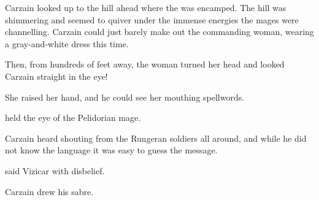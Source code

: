 Carzain looked up to the hill ahead where the \ishrah was encamped. 
The hill was shimmering and seemed to quiver under the immense energies the mages were channelling. 
Carzain could just barely make out the commanding woman, wearing a gray-and-white dress this time.

Then, from hundreds of feet away, the woman turned her head and looked Carzain straight in the eye!

She raised her hand, and he could see her mouthing spellwords. 






\begin{comment}
  \subsection{\Takestsha dispels magic}
\end{comment}
\new
\Takestsha held the eye of the Pelidorian mage. 






\begin{comment}
  \subsection{Carzain is uncovered}
\end{comment}
\new
{}
Carzain heard shouting from the Rungeran soldiers all around, and while he did not know the language it was easy to guess the message. 


 said Vizicar with disbelief.


Carzain drew his sabre. 





